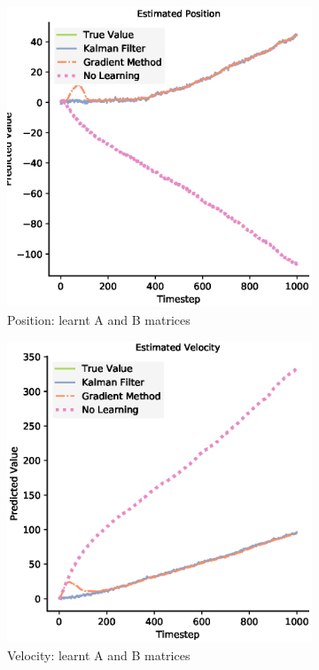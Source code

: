 \begin{figure}[H]
  \begin{subfigure}{0.33\textwidth}
    \centering
    \includegraphics[width=.8\linewidth]{chapter_3_figures/Estimated_Position_AB_matrix.eps}
    \caption{Position: learnt A and B matrices}
  \end{subfigure}
  \begin{subfigure}{0.33\textwidth}
    \centering
    \includegraphics[width=.8\linewidth]{chapter_3_figures/Estimated_Velocity_AB_matrix.eps}
    \caption{Velocity: learnt A and B matrices}
  \end{subfigure}
  \begin{subfigure}{0.33\textwidth}

\end{subfigure}
\end{figure}
